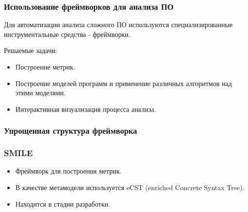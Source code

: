\documentclass{beamer}
\begin{document}
\begin{frame}
\frametitle{Использование фреймворков для анализа ПО}

Для автоматизации анализа сложного ПО используются специализированные
инструментальные средства - фреймворки.

Решаемые задачи:

\begin{itemize}
    \item Построение метрик.
    \item Построение моделей программ и применение различных алгоритмов над
    этими моделями.
    \item Интерактивная визуализация процесса анализа.
\end{itemize}

\end{frame}

\begin{frame}
\frametitle{Упрощенная структура фреймворка}


\end{frame}

\begin{frame}
\frametitle{SMILE}

\begin{itemize}
    \item Фреймворк для построения метрик.
    \item В качестве метамодели используется eCST (enriched Concrete Syntax Tree).
    \item Находится в стадии разработки.
\end{itemize}

\end{frame}
\end{document}
